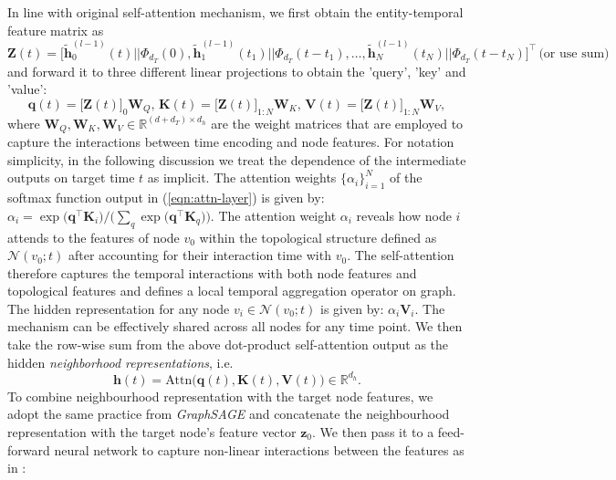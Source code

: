 \documentclass{article} %
\newcommand{\zbf}{\mathbf{z}}
\newcommand{\Zbf}{\mathbf{Z}}
\newcommand{\qbf}{\mathbf{q}}
\newcommand{\Kbf}{\mathbf{K}}
\newcommand{\Vbf}{\mathbf{V}}
\newcommand{\Wbf}{\mathbf{W}}
\newcommand{\hbf}{\mathbf{h}}
\newcommand{\Rbb}{\mathbb{R}}
\begin{document}
In line with original self-attention mechanism, we first obtain the entity-temporal feature matrix as
\begin{equation}
\label{eqn:Z}
\Zbf(t) = \Big[\tilde{\hbf}^{(l-1)}_{0}(t) || \Phi_{d_T}(0), \tilde{\hbf}^{(l-1)}_{1}(t_1) || \Phi_{d_T}(t-t_1), \ldots, \tilde{\hbf}^{(l-1)}_{N}(t_N) || \Phi_{d_T}(t-t_N)\Big]^{\intercal} \, \text{(or use sum)}
\end{equation}
and forward it to three different linear projections to obtain the 'query', 'key' and 'value': 
\[
\qbf(t) = \big[\Zbf(t)
\big]_0\Wbf_Q, \, \Kbf(t) = \big[\Zbf(t)\big]_{1:N}\Wbf_K , \, \Vbf(t) = \big[\Zbf(t)\big]_{1:N}\Wbf_V ,
\]
where $\Wbf_Q, \Wbf_K, \Wbf_V \in \Rbb^{(d+d_T)\times d_h}$ are the weight matrices that are employed to capture the interactions between time encoding and node features. For notation simplicity, in the following discussion we treat the dependence of the intermediate outputs on target time $t$ as implicit. The attention weights $\{\alpha_{i}\}_{i=1}^N$ of the softmax function output in (\ref{eqn:attn-layer}) is given by: $\alpha_{i}=\exp \big(\qbf ^{\intercal} \Kbf_i\big) / \Big(\sum_q \exp \big(\qbf^{\intercal} \Kbf_q\big) \Big)$. 
The attention weight $\alpha_{i}$ reveals how node $i$ attends to the features of node $v_0$ within the topological structure defined as $\mathcal{N}(v_0;t)$ after accounting for their interaction time with $v_0$. The self-attention therefore captures the temporal interactions with both node features and topological features and defines a local temporal aggregation operator on graph. The hidden representation for any node $v_i \in \mathcal{N}(v_0;t)$ is given by: $\alpha_{i}\Vbf_i$. The mechanism can be effectively shared across all nodes for any time point.
We then take the row-wise sum from the above dot-product self-attention output as the hidden \textsl{neighborhood representations}, i.e. 
\[
\hbf(t) = \text{Attn}\big(\qbf(t), \Kbf(t), \Vbf(t)\big) \in \Rbb^{d_h}.
\]
To combine neighbourhood representation with the target node features, we adopt the same practice from \textsl{GraphSAGE} and concatenate the neighbourhood representation with the target node's feature vector $\zbf_{0}$. We then pass it to a feed-forward neural network to capture non-linear interactions between the features as in \citep{vaswani2017attention}:
\end{document}
